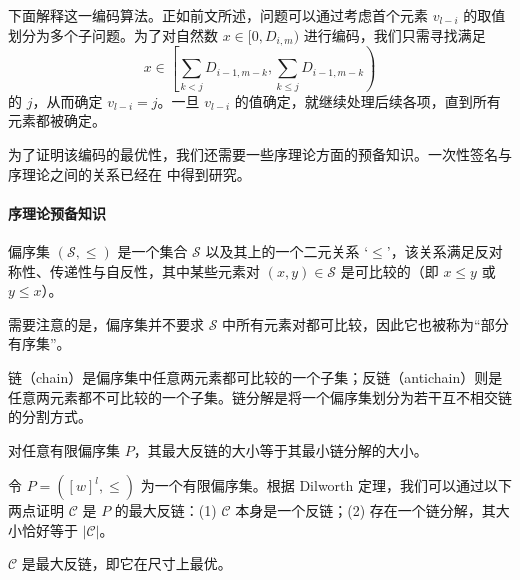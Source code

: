 下面解释这一编码算法。正如前文所述，问题可以通过考虑首个元素 $v_{l-i}$ 的取值划分为多个子问题。为了对自然数 $x\in [0,D_{i,m})$ 进行编码，我们只需寻找满足
\[
    x\in
    \left[
        \sum_{k<j}D_{i-1,m-k},
        \sum_{k\leq j}D_{i-1,m-k}
    \right)
\]
的 $j$，从而确定 $v_{l-i}=j$。一旦 $v_{l-i}$ 的值确定，就继续处理后续各项，直到所有元素都被确定。

为了证明该编码的最优性，我们还需要一些序理论方面的预备知识。一次性签名与序理论之间的关系已经在 \cite{C:BleMau94} 中得到研究。

\paragraph{序理论预备知识}

\begin{definition}[偏序集]
偏序集 $(\mathcal{S},\leq)$ 是一个集合 $\mathcal{S}$ 以及其上的一个二元关系 `$\leq$'，该关系满足反对称性、传递性与自反性，其中某些元素对 $(x,y)\in\mathcal{S}$ 是可比较的（即 $x\leq y$ 或 $y\leq x$）。
\end{definition}
需要注意的是，偏序集并不要求 $\mathcal{S}$ 中所有元素对都可比较，因此它也被称为“部分有序集”。

\begin{definition}[(反)链与分解]
链（chain）是偏序集中任意两元素都可比较的一个子集；反链（antichain）则是任意两元素都不可比较的一个子集。链分解是将一个偏序集划分为若干互不相交链的分割方式。
\end{definition}


\begin{theorem}
     对任意有限偏序集 $P$，其最大反链的大小等于其最小链分解的大小。
\end{theorem}

令 $P=([w]^l,\leq )$ 为一个有限偏序集。根据 Dilworth 定理，我们可以通过以下两点证明 $\mathcal{C}$ 是 $P$ 的最大反链：(1) $\mathcal{C}$ 本身是一个反链；(2) 存在一个链分解，其大小恰好等于 $|\mathcal{C}|$。

\begin{theorem}\label{maximum-antichain}
    $\mathcal{C}$ 是最大反链，即它在尺寸上最优。
\end{theorem}

